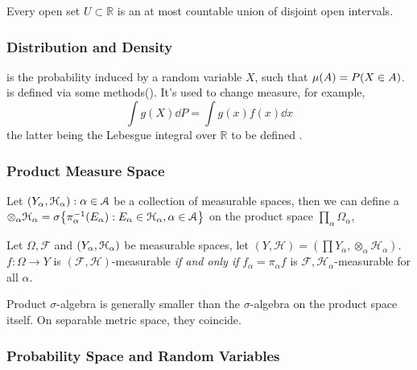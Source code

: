 \begin{thm}
    Every open set \(U \subset \mathbb{R}\) is an at most countable union of disjoint open intervals. 
\end{thm}
\subsubsection{Distribution and Density}

 is the probability induced by a random variable \(X\), such that \(\mu(A) = P\pqty{X \in A}\).  is defined via some methods(). It's used to change measure, for example,
\begin{equation*}
    \int g(X) \dd{P} = \int g(x)f(x)\dd{x}
\end{equation*}
the latter being the Lebesgue integral over \(\mathbb{R}\) to be defined .

\subsubsection{Product Measure Space}

Let \(\pqty{Y_{\alpha}, \mathcal{H}_{\alpha}}: \alpha\in \mathcal{A} \) be a collection of measurable spaces, then we can define a  \(\otimes_{\alpha} \mathcal{H}_{\alpha} = \sigma\Bqty{\pi_{\alpha}^{-1} (E_{\alpha}): E_{\alpha} \in \mathcal{H}_{\alpha}, \alpha \in \mathcal{A}}\) on the product space \(\prod_{\alpha} \Omega_{\alpha}\),  
\begin{proposition}
    Let \(\Omega, \mathcal{F}\) and \(\pqty{Y_{\alpha}, \mathcal{H}_{\alpha}}\) be measurable spaces, let \((Y, \mathcal{H}) = (\prod Y_{\alpha}, \otimes_{\alpha} \mathcal{H}_{\alpha})\). \(f : \Omega \to Y\) is \((\mathcal{F}, \mathcal{H})\)-measurable \textit{if and only if} \(f_{\alpha} = \pi_{\alpha} f\) is \(\mathcal{F} ,\mathcal{H}_{\alpha}\)-measurable for all \(\alpha\).
\end{proposition} 

\begin{proposition}
    Product \(\sigma\)-algebra is generally smaller than the \(\sigma\)-algebra on the product space itself. On separable metric space, they coincide. 
\end{proposition}


\subsubsection{Probability Space and Random Variables}

